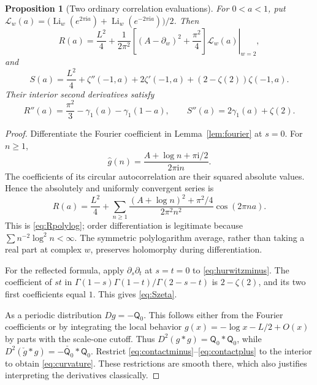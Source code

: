 \documentclass[11pt]{article}
\numberwithin{equation}{section}
\newtheorem{proposition}[theorem]{Proposition}
\theoremstyle{definition}\newtheorem{definition}[theorem]{Definition}
\theoremstyle{remark}\newtheorem{remark}[theorem]{Remark}
\DeclareMathOperator{\Li}{Li}
\newcommand{\iu}{\mathrm i}
\newcommand{\qn}[1]{\mathsf Q_{#1}}
\begin{document}
\begin{proposition}[Two ordinary correlation evaluations]
\label{prop:gammaordinary}
For $0<a<1$, put
$\mathcal L_w(a)=\bigl(\Li_w(e^{2\pi\iu a})+
\Li_w(e^{-2\pi\iu a})\bigr)/2$. Then
\begin{equation}\label{eq:Rpolylog}
 R(a)=\frac{L^2}{4}+
 \left.\frac1{2\pi^2}\left[(A-\partial_w)^2+\frac{\pi^2}{4}\right]
                            \mathcal L_w(a)\right|_{w=2},
\end{equation}
and
\begin{equation}\label{eq:Szeta}
 S(a)=\frac{L^2}{4}+\zeta''(-1,a)+2\zeta'(-1,a)
                                +(2-\zeta(2))\zeta(-1,a).
\end{equation}
Their interior second derivatives satisfy
\begin{equation}\label{eq:curvature}
 R''(a)=\frac{\pi^2}{3}-\gamma_1(a)-\gamma_1(1-a),\qquad
 S''(a)=2\gamma_1(a)+\zeta(2).
\end{equation}
\end{proposition}
\begin{proof}
Differentiate the Fourier coefficient in Lemma~\ref{lem:fourier} at
$s=0$. For $n\ge1$,
\[
 \widehat g(n)=\frac{A+\log n+\pi\iu/2}{2\pi\iu n}.
\]
The coefficients of its circular autocorrelation are their squared
absolute values. Hence the absolutely and uniformly convergent series is
\begin{equation}\label{eq:Rfourier}
 R(a)=\frac{L^2}{4}+
 \sum_{n\ge1}\frac{(A+\log n)^2+\pi^2/4}{2\pi^2n^2}
                                                \cos(2\pi n a).
\end{equation}
This is \eqref{eq:Rpolylog}; order differentiation is legitimate because
$\sum n^{-2}\log^2n<\infty$. The symmetric polylogarithm average,
rather than taking a real part at complex $w$, preserves holomorphy
during differentiation.

For the reflected formula, apply $\partial_s\partial_t$ at $s=t=0$
to \eqref{eq:hurwitzminus}. The coefficient of $st$ in
$\Gamma(1-s)\Gamma(1-t)/\Gamma(2-s-t)$ is $2-\zeta(2)$,
and its two first coefficients equal $1$. This gives \eqref{eq:Szeta}.

As a periodic distribution $Dg=-\qn0$. This follows either from the
Fourier coefficients or by integrating the local behavior
$g(x)=-\log x-L/2+O(x)$ by parts with the scale-one cutoff.
Thus $D^2(g*g)=\qn0*\qn0$, while
$D^2(\check g*g)=-\check{\qn0}*\qn0$.
Restrict \eqref{eq:contactminus}--\eqref{eq:contactplus} to the interior
to obtain \eqref{eq:curvature}. These restrictions are smooth there,
which also justifies interpreting the derivatives classically.
\end{proof}
\end{document}
